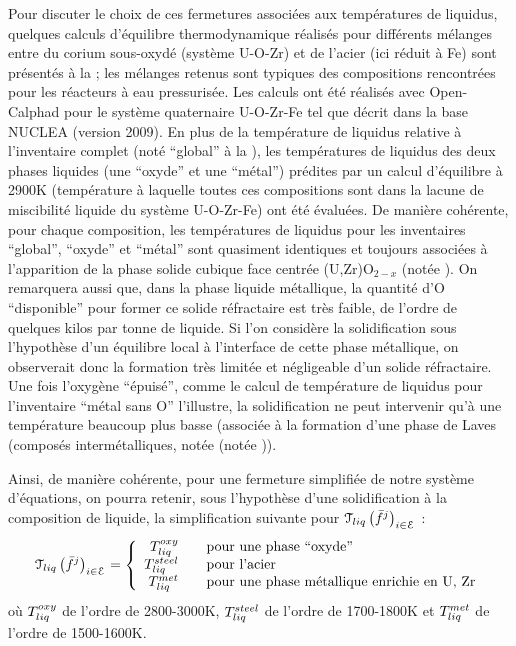 Pour discuter le choix de ces fermetures associées aux températures de liquidus, quelques calculs d'équilibre thermodynamique réalisés pour différents mélanges entre du corium sous-oxydé (système U-O-Zr) et de l'acier (ici réduit à Fe) sont présentés à la  ; les mélanges retenus sont typiques des compositions rencontrées pour les réacteurs à eau pressurisée. Les calculs ont été réalisés avec Open-Calphad \cite{Sundman2015,Sundman2016} pour le système quaternaire U-O-Zr-Fe tel que décrit dans la base NUCLEA \cite{Cheynet2002} (version 2009). En plus de la température de liquidus relative à l'inventaire complet (noté ``global'' à la ), les températures de liquidus des deux phases liquides (une ``oxyde'' et une ``métal'') prédites par un calcul d'équilibre à 2900K (température à laquelle toutes ces compositions sont dans la lacune de miscibilité liquide du système U-O-Zr-Fe) ont été évaluées. De manière cohérente, pour chaque composition, les températures de liquidus pour les inventaires ``global'', ``oxyde'' et ``métal'' sont quasiment identiques et toujours associées à l'apparition de la phase solide cubique face centrée (U,Zr)O$_{2-x}$ (notée ). On remarquera aussi que, dans la phase liquide métallique, la quantité d'O ``disponible'' pour former ce solide réfractaire est très faible, de l'ordre de quelques kilos par tonne de liquide. Si l'on considère la solidification sous l'hypothèse d'un équilibre local à l'interface de cette phase métallique, on observerait donc la formation très limitée et négligeable d'un solide réfractaire. Une fois l'oxygène ``épuisé'', comme le calcul de température de liquidus pour l'inventaire ``métal sans O'' l'illustre, la solidification ne peut intervenir qu'à une température beaucoup plus basse (associée à la formation d'une phase de Laves (composés intermétalliques, notée (notée )).

Ainsi, de manière cohérente, pour une fermeture simplifiée de notre système d'équations, on pourra retenir, sous l'hypothèse d'une solidification à la composition de liquide, la simplification suivante pour $\Mc{T}_{liq}\left(\elementMassFraction[j]{}\right)_{i\in\elementSet}$ :
\begin{equation}
 \Mc{T}_{liq}\left(\elementMassFraction[j]{}\right)_{i\in\elementSet} = 
 \left\{\begin{array}{rcl} \temperature[oxy]{liq} & & \text{pour une phase ``oxyde''} \\
                           \temperature[steel]{liq} & & \text{pour l'acier} \\
                           \temperature[met]{liq} & & \text{pour une phase métallique enrichie en U, Zr} 
 \end{array}\right.
\end{equation}
où $\temperature[oxy]{liq}$ de l'ordre de 2800-3000K, $\temperature[steel]{liq}$ de l'ordre de 1700-1800K et $\temperature[met]{liq}$ de l'ordre de 1500-1600K.

